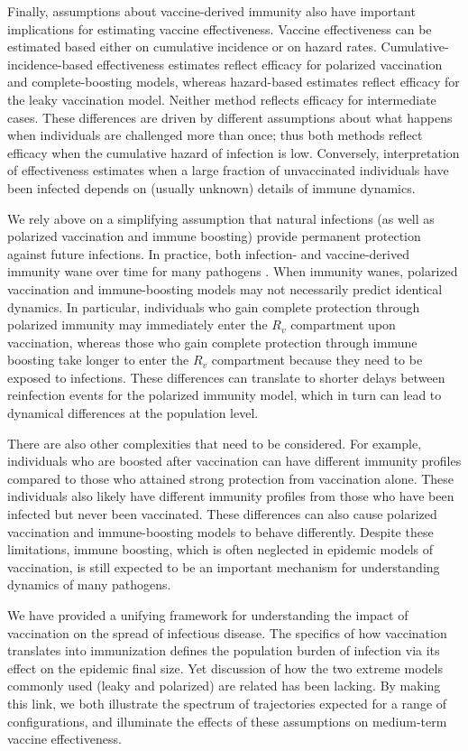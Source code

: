 \documentclass[12pt]{article}
\begin{document}
Finally, assumptions about vaccine-derived immunity also have important implications for estimating vaccine effectiveness.
Vaccine effectiveness can be estimated based either on cumulative incidence or on hazard rates.
Cumulative-incidence-based effectiveness estimates reflect efficacy for polarized vaccination and complete-boosting models,
whereas hazard-based estimates reflect efficacy for the leaky vaccination model.
Neither method reflects efficacy for intermediate cases.
These differences are driven by different assumptions about what happens when individuals are challenged more than once; thus both methods reflect efficacy when the cumulative hazard of infection is low. 
Conversely, interpretation of effectiveness estimates when a large fraction of unvaccinated individuals have been infected depends on (usually unknown) details of immune dynamics.

We rely above on a simplifying assumption that natural infections (as well as polarized vaccination and immune boosting) provide permanent protection against future infections.
In practice, both infection- and vaccine-derived immunity wane over time for many pathogens \citep{heffernan2009implications,lewnard2018vaccine,perez2022}.
When immunity wanes, polarized vaccination and immune-boosting models may not necessarily predict identical dynamics.
In particular, individuals who gain complete protection through polarized immunity may immediately enter the $R_v$ compartment upon vaccination, whereas those who gain complete protection through immune boosting take longer to enter the $R_v$ compartment because they need to be exposed to infections.
These differences can translate to shorter delays between reinfection events for the polarized immunity model, which in turn can lead to dynamical differences at the population level.

There are also other complexities that need to be considered.
For example, individuals who are boosted after vaccination can have different immunity profiles compared to those who attained strong protection from vaccination alone.
These individuals also likely have different immunity profiles from those who have been infected but never been vaccinated.
These differences can also cause polarized vaccination and immune-boosting models to behave differently.
Despite these limitations, immune boosting, which is often neglected in epidemic models of vaccination, is still expected to be an important mechanism for understanding dynamics of many pathogens.

We have provided a unifying framework for understanding the impact of vaccination on the spread of infectious disease.
The specifics of how vaccination translates into immunization defines the population burden of infection via its effect on the epidemic final size.
Yet discussion of how the two extreme models commonly used (leaky and polarized) are related has been lacking.
By making this link, we both illustrate the spectrum of trajectories expected for a range of configurations, and illuminate the effects of these assumptions on medium-term vaccine effectiveness.
\end{document}
